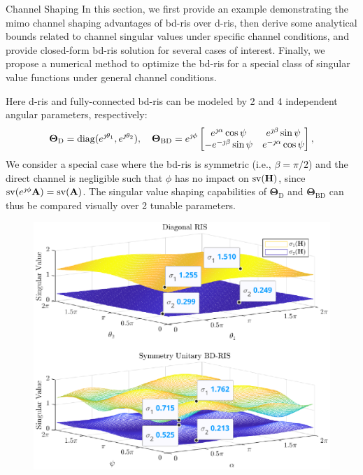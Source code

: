 \documentclass[journal]{IEEEtran}
\begin{document}
\begin{section}{Channel Shaping}
	In this section, we first provide an example demonstrating the \gls{mimo} channel shaping advantages of \gls{bd}-\gls{ris} over \gls{d}-\gls{ris}, then derive some analytical bounds related to channel singular values under specific channel conditions, and provide closed-form \gls{bd}-\gls{ris} solution for several cases of interest.
	Finally, we propose a numerical method to optimize the \gls{bd}-\gls{ris} for a special class of singular value functions under general channel conditions.

	\begin{example}
		\label{eg:shaping_potential}
		Here \gls{d}-\gls{ris} and fully-connected \gls{bd}-\gls{ris} can be modeled by 2 and 4 independent angular parameters, respectively:
		\begin{equation*}
			\mathbf{\Theta}_\mathrm{D} = \operatorname{diag}(e^{\jmath \theta_1}, e^{\jmath \theta_2}), \quad
			\mathbf{\Theta}_\mathrm{BD} = e^{\jmath \phi} \begin{bmatrix}
				e^{\jmath \alpha} \cos \psi  & e^{\jmath \beta} \sin \psi   \\
				-e^{-\jmath \beta} \sin \psi & e^{-\jmath \alpha} \cos \psi
			\end{bmatrix},
		\end{equation*}
		We consider a special case where the \gls{bd}-\gls{ris} is symmetric (i.e., $\beta = \pi / 2$) and the direct channel is negligible such that $\phi$ has no impact on $\operatorname{sv}(\mathbf{H})$, since $\operatorname{sv}(e^{\jmath \phi} \mathbf{A}) = \operatorname{sv}(\mathbf{A})$.
		The singular value shaping capabilities of $\mathbf{\Theta}_\mathrm{D}$ and $\mathbf{\Theta}_\mathrm{BD}$ can thus be compared visually over 2 tunable parameters.
		\begin{figure}
			\centering
			\includegraphics[width=0.7\columnwidth]{../assets/simulation/pc_singular_trend.eps}

\end{figure}
\end{example}
\end{section}
\end{document}
